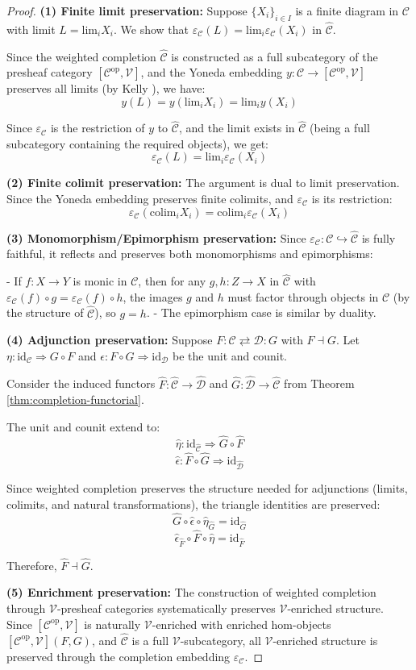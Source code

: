 \documentclass[11pt]{article}
\theoremstyle{plain}
\theoremstyle{definition}
\theoremstyle{remark}
\newcommand{\V}{\mathcal{V}}
\newcommand{\C}{\mathcal{C}}
\newcommand{\D}{\mathcal{D}}
\newcommand{\op}{\mathrm{op}}
\newcommand{\colim}{\mathrm{colim}}
\renewcommand{\lim}{\mathrm{lim}}
\newcommand{\wh}[1]{\widehat{#1}}
\begin{document}
\begin{proof}
\textbf{(1) Finite limit preservation:}
Suppose $\{X_i\}_{i \in I}$ is a finite diagram in $\C$ with limit $L = \lim_i X_i$. We show that $\varepsilon_\C(L) = \lim_i \varepsilon_\C(X_i)$ in $\wh{\C}$.

Since the weighted completion $\wh{\C}$ is constructed as a full subcategory of the presheaf category $[\C^{\op}, \V]$, and the Yoneda embedding $y : \C \to [\C^{\op}, \V]$ preserves all limits (by Kelly \cite{kelly1982basic}), we have:
$$y(L) = y(\lim_i X_i) = \lim_i y(X_i)$$

Since $\varepsilon_\C$ is the restriction of $y$ to $\wh{\C}$, and the limit exists in $\wh{\C}$ (being a full subcategory containing the required objects), we get:
$$\varepsilon_\C(L) = \lim_i \varepsilon_\C(X_i)$$

\textbf{(2) Finite colimit preservation:}
The argument is dual to limit preservation. Since the Yoneda embedding preserves finite colimits, and $\varepsilon_\C$ is its restriction:
$$\varepsilon_\C(\colim_i X_i) = \colim_i \varepsilon_\C(X_i)$$

\textbf{(3) Monomorphism/Epimorphism preservation:}
Since $\varepsilon_\C : \C \hookrightarrow \wh{\C}$ is fully faithful, it reflects and preserves both monomorphisms and epimorphisms:

- If $f : X \to Y$ is monic in $\C$, then for any $g, h : Z \to X$ in $\wh{\C}$ with $\varepsilon_\C(f) \circ g = \varepsilon_\C(f) \circ h$, the images $g$ and $h$ must factor through objects in $\C$ (by the structure of $\wh{\C}$), so $g = h$.
- The epimorphism case is similar by duality.

\textbf{(4) Adjunction preservation:}
Suppose $F : \C \rightleftarrows \D : G$ with $F \dashv G$. Let $\eta : \text{id}_\C \Rightarrow G \circ F$ and $\epsilon : F \circ G \Rightarrow \text{id}_\D$ be the unit and counit.

Consider the induced functors $\wh{F} : \wh{\C} \to \wh{\D}$ and $\wh{G} : \wh{\D} \to \wh{\C}$ from Theorem \ref{thm:completion-functorial}.

The unit and counit extend to:
$$\wh{\eta} : \text{id}_{\wh{\C}} \Rightarrow \wh{G} \circ \wh{F}$$
$$\wh{\epsilon} : \wh{F} \circ \wh{G} \Rightarrow \text{id}_{\wh{\D}}$$

Since weighted completion preserves the structure needed for adjunctions (limits, colimits, and natural transformations), the triangle identities are preserved:
$$\wh{G} \circ \wh{\epsilon} \circ \wh{\eta}_{\wh{G}} = \text{id}_{\wh{G}}$$
$$\wh{\epsilon}_{\wh{F}} \circ \wh{F} \circ \wh{\eta} = \text{id}_{\wh{F}}$$

Therefore, $\wh{F} \dashv \wh{G}$.

\textbf{(5) Enrichment preservation:}
The construction of weighted completion through $\V$-presheaf categories systematically preserves $\V$-enriched structure. Since $[\C^{\op}, \V]$ is naturally $\V$-enriched with enriched hom-objects $[\C^{\op}, \V](F, G)$, and $\wh{\C}$ is a full $\V$-subcategory, all $\V$-enriched structure is preserved through the completion embedding $\varepsilon_\C$.
\end{proof}
\end{document}
